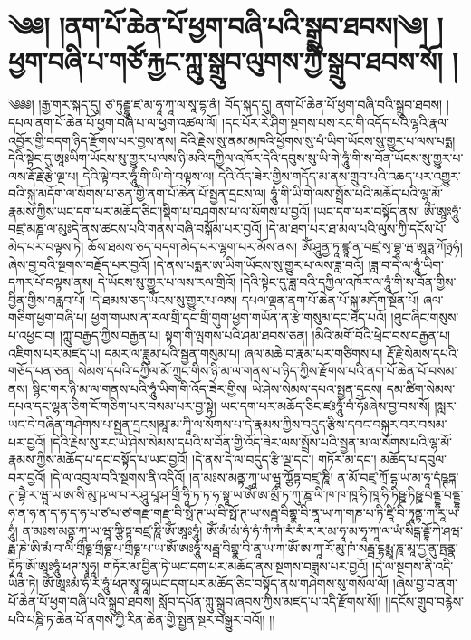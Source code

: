 \chapter{༄༅། །ནག་པོ་ཆེན་པོ་ཕྱག་བཞི་པའི་སྒྲུབ་ཐབས།༄། །ཕྱག་བཞི་པ་གཙོ་རྐྱང་ཀླུ་སྒྲུབ་ལུགས་ཀྱི་སྒྲུབ་ཐབས་སོ། ། }༄༅༅། །རྒྱ་གར་སྐད་དུ། ཙ་ཏུརྦྷུ་ཛ་མ་ཧཱ་ཀཱ་ལ་སཱ་དྷ་ནཾ། བོད་སྐད་དུ། ནག་པོ་ཆེན་པོ་ཕྱག་བཞི་བའི་སྒྲུབ་ཐབས། །དཔལ་ནག་པོ་ཆེན་པོ་ཕྱག་བཞི་པ་ལ་ཕྱག་འཚལ་ལོ། །དང་པོར་རེ་ཤིག་སྔགས་པས་རང་གི་འདོད་པའི་ལྷའི་རྣལ་འབྱོར་གྱི་བདག་ཉིད་རྫོགས་པར་བྱས་ནས། དེའི་རྗེས་སུ་ནམ་མཁའི་ཕྱོགས་སུ་པཾ་ཡིག་ཡོངས་སུ་གྱུར་པ་ལས་པདྨ། དེའི་སྟེང་དུ་ཨཱཿཡིག་ཡོངས་སུ་གྱུར་པ་ལས་ཉི་མའི་དཀྱིལ་འཁོར་དེའི་དབུས་སུ་ཡི་གེ་ཧཱུཾ་གི་ས་བོན་ཡོངས་སུ་གྱུར་པ་ལས་རྡོ་རྗེ་རྩེ་ལྔ་པ། དེའི་ལྟེ་བར་ཧཱུཾ་གི་ཡི་གེ་བལྟས་ལ། དེའི་འོད་ཟེར་གྱིས་གདོད་མ་ནས་གྲུབ་པའི་འཆད་པར་འགྱུར་བའི་སྐུ་མདོག་ལ་སོགས་པ་ཅན་གྱི་ནག་པོ་ཆེན་པོ་སྤྱན་དྲངས་ལ། ཧཱུཾ་གི་ཡི་གེ་ལས་སྤྲོས་པའི་མཆོད་པའི་ལྷ་མོ་རྣམས་ཀྱིས་ཡང་དག་པར་མཆོད་ཅིང་།སྡིག་པ་བཤགས་པ་ལ་སོགས་པ་བྱའོ། །ཡང་དག་པར་བསྟོད་ནས། ཨོཾ་ཨཱཿཧཱུཾ་བཛྲ་མཎྜ་ལ་མུཿདེ་ནས་ཚངས་པའི་གནས་བཞི་བསྒོམ་པར་བྱའོ། །དེ་མ་ཐག་པར་ཐ་མལ་པའི་ལུས་ཀྱི་དངོས་པོ་མེད་པར་བལྟས་ཏེ། ཆོས་ཐམས་ཅད་བདག་མེད་པར་ལྷག་པར་མོས་ནས། ཨོཾ་ཤཱུནྱ་ཏཱ་ཛྙཱ་ན་བཛྲ་སྭ་བྷཱ་ཝ་ཨཱཏྨ་ཀོཉྲཧཾ།ཞེས་བྱ་བའི་སྔགས་བརྗོད་པར་བྱའོ། །དེ་ནས་པདྨར་ཨ་ཡིག་ཡོངས་སུ་གྱུར་པ་ལས་ཟླ་བའོ། །ཟླ་བ་དེ་ལ་ཧཱུཾ་ཡིག་དཀར་པོ་བལྟས་ནས། དེ་ཡོངས་སུ་གྱུར་པ་ལས་རལ་གྲིའོ། །དེའི་སྟེང་དུ་ཟླ་བའི་དཀྱིལ་འཁོར་ལ་ཧཱུཾ་གི་ས་བོན་གྱིས་བྱིན་གྱིས་བརླབ་པོ། །དེ་ཐམས་ཅད་ཡོངས་སུ་གྱུར་པ་ལས། དཔལ་ལྡན་ནག་པོ་ཆེན་པོ་སྐུ་མདོག་སྔོན་པོ། ཞལ་གཅིག་ཕྱག་བཞི་པ། ཕྱག་གཡས་ན་རལ་གྲི་དང་གྲི་གུག་ཕྱག་གཡོན་ན་རྩེ་གསུམ་དང་ཐོད་པའོ། །ཐུང་ཞིང་གསུས་པ་འཕྱང་བ། །ཀླུ་བརྒྱད་ཀྱིས་བརྒྱན་པ། སྟག་གི་ལྤགས་པའི་ཤམ་ཐབས་ཅན། །མིའི་མགོ་བོའི་ཕྲེང་བས་བརྒྱན་པ། འཇིགས་པར་མཛད་པ། དམར་ལ་ཟླུམ་པའི་སྦྱན་གསུམ་པ། ཞལ་མཆེ་བ་རྣམ་པར་གཙིགས་པ། རྡོ་རྗེ་སེམས་དཔའི་གཅོད་པན་ཅན། སེམས་དཔའི་དཀྱིལ་མོ་ཀྲུང་གིས་ཉི་མ་ལ་གནས་པ་ཉིད་ཀྱིས་རྫོགས་པའི་ནག་པོ་ཆེན་པོ་བསམ་ནས། སྙིང་གར་ཉི་མ་ལ་གནས་པའི་ཧཱུཾ་ཡིག་གི་འོད་ཟེར་གྱིས། ཡེ་ཤེས་སེམས་དཔའ་སྤྱན་དྲངས། དམ་ཚིག་སེམས་དཔའ་དང་ལྷན་ཅིག་ངོ་གཅིག་པར་བསམ་པར་བྱ་སྟེ། ཡང་དག་པར་མཆོད་ཅིང་ཛཿཧཱུཾ་བཾ་ཧོཿཞེས་བྱ་བས་སོ། །སླར་ཡང་དེ་བཞིན་གཤེགས་པ་སྤྱན་དྲངས།མཱ་མ་ཀཱི་ལ་སོགས་པ་དེ་རྣམས་ཀྱིས་བདུད་རྩིས་དབང་བསྐུར་བར་བསམ་པར་བྱའོ། །དེའི་རྗེས་སུ་རང་ཡེ་ཤེས་སེམས་དཔའི་ས་བོན་གྱི་འོད་ཟེར་ལས་སྤྲོས་པའི་སྦྱན་མ་ལ་སོགས་པའི་ལྷ་མོ་རྣམས་ཀྱིས་མཆོད་པ་དང་བསྟོད་པ་ཡང་བྱའོ། །དེ་ནས་དེ་ལ་བདུད་རྩི་ལྔ་དང་། གཏོར་མ་དང་། མཆོད་པ་དབུལ་བར་བྱའོ། །དེ་ལ་འབུལ་བའི་སྔགས་ནི་འདིའོ། །ན་མཿས་མནྟ་ཀཱ་ཡ་ཝཱ་ཀྩོཏྟ་བཛྲ་ཎཱི། ན་མོ་བཛྲ་ཀྲོ་དྷ་ཡ་མ་ཧཱ་དཾཥྚཏྐ་ཊ་བྷཻ་ར་ཝཱ་ཡ་ཨ་སི་མུ་ཥ་ལ་པ་ར་ཤཱུ་པཱ་ཤ་གྲྀ་ཧཱི་ཏ་ཏ་ཧ་སྟཱ་ཡ་ཨོཾ་ཨ་མྲྀ་ཏ་ཀུ་ཎྜ་ལི་ཁ་ཁ་ཁཱ་ཧི་ཁཱ་ཧི་ཏིཥྛ་ཏིཥྛ་བནྡྷ་བནྡྷ་ཧ་ན་ཧ་ན་ད་ཧ་ད་ཧ་པ་ཙ་པ་ཙ་གརྫ་གརྫ་བི་སྥོ་ཊ་ཡ་བི་སྥོ་ཊ་ཡ་སརྦྦ་བིགྷྣ་བི་ནཱ་ཡ་ཀ་གཎ་པ་ཏི་ཛཱི་བི་ཏཱནྟ་ཀ་རཱ་ཡ་ཧཱུཾ། ན་མཿས་མནྟ་ཀཱ་ཡ་ཝཱ་ཀྩི་ཏྟ་བཛྲ་ཎཱི་ཨོཾ་ཨཱཿཧཱུཾ། ཨོཾ་མཾ་མཾ་ཧཾ་ཧཾ་ཀཾ་ཀཾ་རཾ་རཾ་ར་ར་མ་ཧཱ་མ་ཧཱ་ཀཱ་ལ་ཡཾ་སིངྒ་རྡྷོ་ཀེ་ཤཝ་རྟྨ་ཎེ་ཨི་མཾ་བ་ལིཾ་གྲྀཧྞ་གྲྀཧྞ་པ་གྲྀཧྞ་པ་ཡ་ཨོཾ་ཨཿཧཱུཾ་སརྦྦ་བིགྷྣ་བི་ནཱ་ཡ་ཀ་ཨོཾ་ཨ་ཀཱ་རོ་མུ་ཁཾ་སརྦྦ་དྷརྨྨཱ་ཎཱ་མཱ་དྱ་ནུ་ཏྤནྣ་ཏྭོཏཱ་ཨོ་ཨཱཿཧཱུཾ་ཕཊ་སྭཱཧཱ། གཏོར་མ་བྱིན་ཏེ་ཡང་དག་པར་མཆོད་ནས་སྔགས་བཟླས་པར་བྱའོ། །དེ་ལ་སྔགས་ནི་འདི་ཡིན་ཏེ། ཨོཾ་ཨཱཿམཾ་ཧཾ་རཾ་ཧཱུཾ་ཕཊ་སྭཱ་ཧཱ།ཡང་དག་པར་མཆོད་ཅིང་བསྟོད་ནས་གཤེགས་སུ་གསོལ་ལོ། །ཞེས་བྱ་བ་ནག་པོ་ཆེན་པོ་ཕྱག་བཞི་པའི་སྒྲུབ་ཐབས། སློབ་དཔོན་ཀླུ་སྒྲུབ་ཞབས་ཀྱིས་མཛད་པ་འདི་རྫོགས་སོ།། །།དངོས་གྲུབ་བརྙེས་པའི་པཎྜི་ཏ་ཆེན་པོ་ནགས་ཀྱི་རིན་ཆེན་གྱི་སྤྱན་སྔར་བསྒྱུར་བའོ།། །།